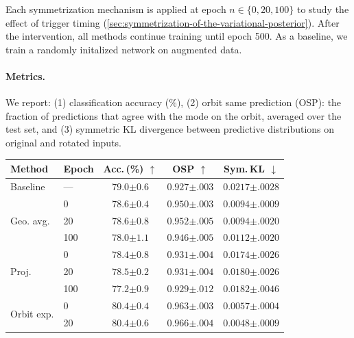 \documentclass{article}
\begin{document}
Each symmetrization mechanism is applied at epoch $n \in \{0, 20, 100\}$ to study the effect of trigger timing (\cref{sec:symmetrization-of-the-variational-posterior}). After the intervention, all methods continue training until epoch 500. As a baseline, we train a randomly initalized network on augmented data.
\paragraph{Metrics.} We report: (1) classification accuracy (\%), (2) orbit same prediction (OSP): the fraction of predictions that agree with the mode on the orbit, averaged over the test set, and (3) symmetric KL divergence between predictive distributions on original and rotated inputs.

\begin{table}
    \centering
    \footnotesize
    \setlength{\tabcolsep}{4pt}
    \begin{tabular}{@{}ll ccc@{}}
    \toprule
    \textbf{Method} & \textbf{Epoch}
      & \textbf{Acc.\,(\%)} $\uparrow$
      & \textbf{OSP} $\uparrow$
      & \textbf{Sym.\,KL} $\downarrow$ \\
    \midrule
    Baseline & ---
      & $79.0{\scriptstyle\pm0.6}$
      & $0.927{\scriptstyle\pm.003}$
      & $0.0217{\scriptstyle\pm.0028}$ \\
    \midrule
    \multirow{3}{*}{Geo. avg.}
      & 0   & $78.6{\scriptstyle\pm0.4}$ & $0.950{\scriptstyle\pm.003}$ & $0.0094{\scriptstyle\pm.0009}$ \\
      & 20  & $78.6{\scriptstyle\pm0.8}$ & $0.952{\scriptstyle\pm.005}$ & $0.0094{\scriptstyle\pm.0020}$ \\
      & 100 & $78.0{\scriptstyle\pm1.1}$ & $0.946{\scriptstyle\pm.005}$ & $0.0112{\scriptstyle\pm.0020}$ \\
    \midrule
    \multirow{3}{*}{Proj.}
      & 0   & $78.4{\scriptstyle\pm0.8}$ & $0.931{\scriptstyle\pm.004}$ & $0.0174{\scriptstyle\pm.0026}$ \\
      & 20  & $78.5{\scriptstyle\pm0.2}$ & $0.931{\scriptstyle\pm.004}$ & $0.0180{\scriptstyle\pm.0026}$ \\
      & 100 & $77.2{\scriptstyle\pm0.9}$ & $0.929{\scriptstyle\pm.012}$ & $0.0182{\scriptstyle\pm.0046}$ \\
    \midrule
    \multirow{3}{*}{Orbit exp.}
      & 0   & $80.4{\scriptstyle\pm0.4}$ & $0.963{\scriptstyle\pm.003}$ & $0.0057{\scriptstyle\pm.0004}$ \\
      & 20 & $\mathbf{80.4}{\scriptstyle\pm0.6}$ & $0.966{\scriptstyle\pm.004}$ & $0.0048{\scriptstyle\pm.0009}$ \\

\end{tabular}
\end{table}
\end{document}

